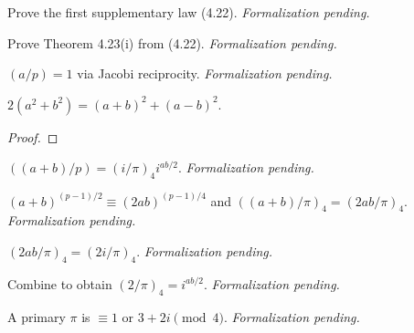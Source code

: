\begin{theorem}[Exercise 4.22]
  \label{exr:s4_22}
  \notready
  Prove the first supplementary law (4.22). \emph{Formalization pending.}
\end{theorem}

\begin{theorem}[Exercise 4.23]
  \label{exr:s4_23}
  \notready
  Prove Theorem 4.23(i) from (4.22). \emph{Formalization pending.}
\end{theorem}

\begin{theorem}[Exercise 4.24(a)]
  \label{exr:s4_24_a}
  \notready
  $(a/p) = 1$ via Jacobi reciprocity. \emph{Formalization pending.}
\end{theorem}

\begin{theorem}[Exercise 4.24(b)]
  \label{exr:s4_24_b}
  \leanok
  $2(a^2+b^2) = (a+b)^2 + (a-b)^2$.
\end{theorem}
\begin{proof}\leanok\end{proof}

\begin{theorem}[Exercise 4.24(c)]
  \label{exr:s4_24_c}
  \notready
  $((a+b)/p) = (i/\pi)_4 i^{ab/2}$. \emph{Formalization pending.}
\end{theorem}

\begin{theorem}[Exercise 4.24(d)]
  \label{exr:s4_24_d}
  \notready
  $(a+b)^{(p-1)/2} \equiv (2ab)^{(p-1)/4}$ and $((a+b)/\pi)_4 = (2ab/\pi)_4$.
  \emph{Formalization pending.}
\end{theorem}

\begin{theorem}[Exercise 4.24(e)]
  \label{exr:s4_24_e}
  \notready
  $(2ab/\pi)_4 = (2i/\pi)_4$. \emph{Formalization pending.}
\end{theorem}

\begin{theorem}[Exercise 4.24(f)]
  \label{exr:s4_24_f}
  \notready
  Combine to obtain $(2/\pi)_4 = i^{ab/2}$. \emph{Formalization pending.}
\end{theorem}

\begin{theorem}[Exercise 4.25(a)]
  \label{exr:s4_25_a}
  \notready
  A primary $\pi$ is $\equiv 1$ or $3 + 2i \pmod 4$. \emph{Formalization pending.}
\end{theorem}

